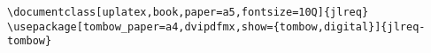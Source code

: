 \documentclass[uplatex,book,paper=a5,fontsize=10Q]{jlreq}
\begin{document}
\begin{verbatim}
\documentclass[uplatex,book,paper=a5,fontsize=10Q]{jlreq}
\usepackage[tombow_paper=a4,dvipdfmx,show={tombow,digital}]{jlreq-tombow}
\end{verbatim}
\end{document}
